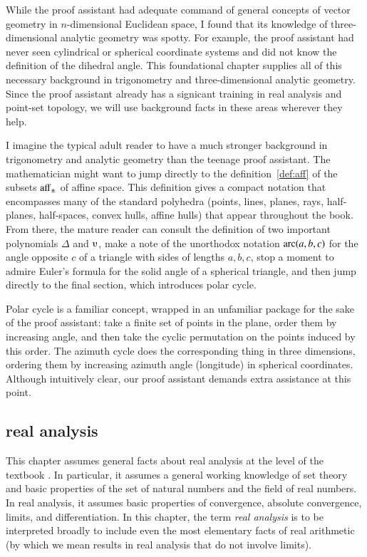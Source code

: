 While the proof assistant had adequate command of general concepts of
vector geometry in $n$-dimensional Euclidean space, I found that its
knowledge of three-dimensional analytic geometry was spotty.  For
example, the proof assistant had never seen cylindrical or spherical
coordinate systems and did not know the definition of the dihedral
angle.  This foundational chapter supplies all of this necessary
background in trigonometry and three-dimensional analytic geometry.
Since the proof assistant already has a signicant training  in real analysis and
point-set topology, we will use background facts in these areas wherever they
help.

I imagine the typical adult reader to have a much stronger background in
trigonometry and analytic geometry than the teenage proof assistant.  
The mathematician might want to jump directly to the definition~\ref{def:aff}
of the subsets ${\operatorname{aff}}_\pm$
of affine space.  This definition gives a compact notation that 
encompasses many of the standard polyhedra (points,
lines, planes, rays, half-planes, half-spaces, convex hulls, affine hulls) that 
appear throughout  the book.  From there, the mature reader can consult 
the definition of two important polynomials $\Delta$ and $\ups$, make a note
of the unorthodox notation $\operatorname{arc}(a,b,c)$ for the angle opposite $c$ of a triangle with sides
of lengths $a,b,c$, stop a moment 
to admire Euler's formula for the solid angle of a spherical
triangle, and then jump directly to the final section, which introduces polar cycle.

Polar cycle is a familiar concept, wrapped in an unfamiliar package for the sake of the
proof assistant: take a finite set of points in the plane, order them by increasing
angle, and then take the cyclic permutation on the points induced by this order.  The azimuth
cycle does the corresponding thing in three dimensions, ordering them by increasing
azimuth angle (longitude) in spherical coordinates.  Although intuitively clear, our proof
assistant demands extra assistance at this point.



\subsection{real analysis}
\label{back:analysis}  
  This chapter assumes general facts about
  \hypertarget{back:analysis}{real analysis} at the level of the
  textbook \cite{unknown}. %
  In particular, it assumes a general working knowledge of set theory 
and basic properties of the set of natural numbers and the
  field of real numbers.  In real analysis, it assumes basic
  properties of convergence, absolute convergence, limits, and
  differentiation.  In this chapter, the term {\it real analysis} is
  to be interpreted broadly to include even the most elementary facts
  of real arithmetic (by which we mean results in real analysis that
  do not involve limits).


